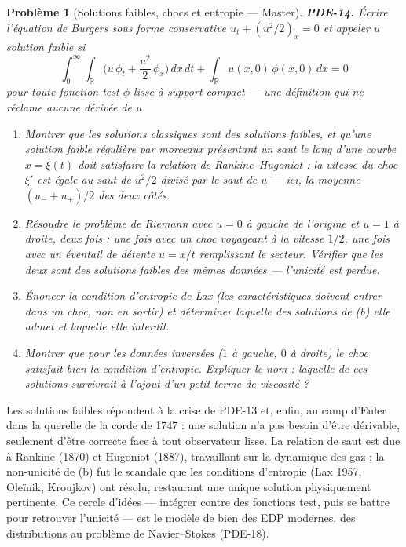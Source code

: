 \documentclass[11pt]{article}
\newtheorem{problem}{Problème}
\begin{document}
\bigskip

\begin{problem}[{Solutions faibles, chocs et entropie --- Master}]
\textbf{PDE-14.} Écrire l'équation de Burgers sous forme conservative
$u_t + (u^2/2)_x = 0$ et appeler $u$ \textit{solution faible} si
\[ \int_0^\infty\!\!\int_{\mathbb{R}} \Big( u\,\phi_t + \frac{u^2}{2}\,\phi_x \Big)\,dx\,dt
+ \int_{\mathbb{R}} u(x,0)\,\phi(x,0)\,dx = 0 \]
pour toute fonction test $\phi$ lisse à support compact --- une définition qui ne réclame
aucune dérivée de $u$.
\begin{enumerate}
\item[(a)] Montrer que les solutions classiques sont des solutions
faibles, et qu'une solution faible régulière par morceaux présentant un saut le long d'une courbe
$x = \xi(t)$ doit satisfaire la relation de Rankine--Hugoniot : la vitesse du choc
$\xi'$ est égale au saut de $u^2/2$ divisé par le saut de $u$ --- ici, la
moyenne $(u_- + u_+)/2$ des deux côtés.
\item[(b)] Résoudre le problème de Riemann avec
$u = 0$ à gauche de l'origine et $u = 1$ à droite, deux fois : une fois avec un
choc voyageant à la vitesse $1/2$, une fois avec un éventail de détente $u = x/t$ remplissant
le secteur. Vérifier que \textit{les deux} sont des solutions faibles des mêmes données ---
l'unicité est perdue.
\item[(c)] Énoncer la condition d'entropie de Lax (les caractéristiques doivent entrer dans un
choc, non en sortir) et déterminer laquelle des solutions de (b) elle admet et laquelle
elle interdit.
\item[(d)] Montrer que pour les données inversées ($1$ à gauche, $0$ à
droite) le choc satisfait bien la condition d'entropie. Expliquer le nom : laquelle de
ces solutions survivrait à l'ajout d'un petit terme de viscosité ?
\end{enumerate}

\end{problem}

\noindent Les solutions faibles répondent à la crise de PDE-13 et, enfin, au camp d'Euler
dans la querelle de la corde de 1747 : une \og{} solution \fg{} n'a pas besoin d'être dérivable, seulement
d'être correcte face à tout observateur lisse. La relation de saut est due à Rankine (1870)
et Hugoniot (1887), travaillant sur la dynamique des gaz ; la non-unicité de (b) fut le
scandale que les conditions d'entropie (Lax 1957, Oleïnik, Kroujkov) ont résolu, restaurant
une unique solution physiquement pertinente. Ce cercle d'idées --- intégrer contre des
fonctions test, puis se battre pour retrouver l'unicité --- est le modèle de bien des EDP
modernes, des distributions au problème de Navier--Stokes (PDE-18).
\end{document}
